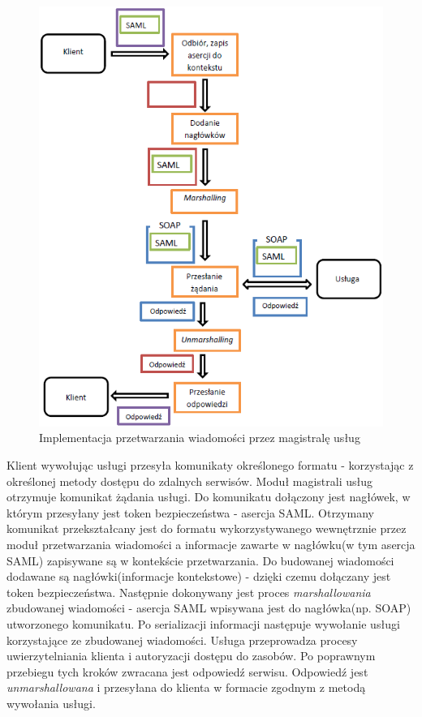 	\begin{figure}[h]
		\centering
		\includegraphics{img/esbRoute.png}
		\caption{Implementacja przetwarzania wiadomości przez magistralę usług}
		\label{ESB route}
	\end{figure}

	Klient wywołując usługi przesyła komunikaty określonego formatu - korzystając z określonej metody dostępu do zdalnych serwisów. Moduł magistrali usług otrzymuje komunikat żądania usługi. Do komunikatu dołączony jest nagłówek, w którym przesyłany jest token bezpieczeństwa - asercja SAML. Otrzymany komunikat przekształcany jest do formatu wykorzystywanego wewnętrznie przez moduł przetwarzania wiadomości a informacje zawarte w nagłówku(w tym asercja SAML) zapisywane są w kontekście przetwarzania. Do budowanej wiadomości dodawane są nagłówki(informacje kontekstowe) - dzięki czemu dołączany jest token bezpieczeństwa. Następnie dokonywany jest proces \textit{marshallowania} zbudowanej wiadomości - asercja SAML wpisywana jest do nagłówka(np. SOAP) utworzonego komunikatu. Po serializacji informacji następuje wywołanie usługi korzystające ze zbudowanej wiadomości. Usługa przeprowadza procesy uwierzytelniania klienta i autoryzacji dostępu do zasobów. Po poprawnym przebiegu tych kroków zwracana jest odpowiedź serwisu. Odpowiedź jest \textit{unmarshallowana} i przesyłana do klienta w formacie zgodnym z metodą wywołania usługi.

